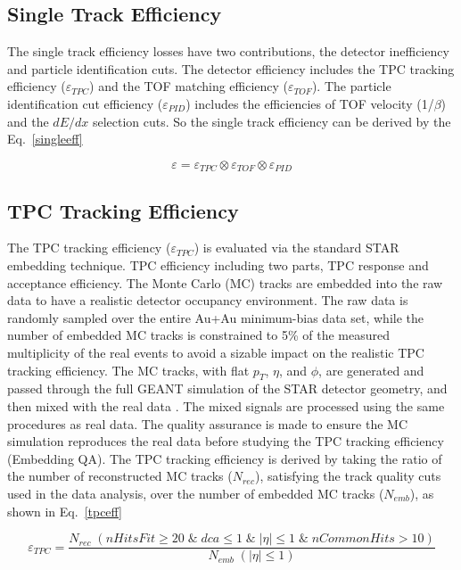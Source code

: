 \subsection{Single Track Efficiency}

The single track efficiency losses have two contributions, the detector inefficiency and particle identification cuts. The detector efficiency includes the TPC tracking efficiency ($\varepsilon_{TPC}$) and the TOF matching efficiency ($\varepsilon_{TOF}$). The particle identification cut efficiency ($\varepsilon_{PID}$) includes the efficiencies of TOF velocity (1/$\beta$) and the $dE/dx$ selection cuts. So the single track efficiency can be derived by the Eq.~\ref{singleeff}

\begin{equation}
\varepsilon = \varepsilon_{TPC} \otimes \varepsilon_{TOF} \otimes \varepsilon_{PID}
\label{singleeff}
\end{equation}

\subsection{TPC Tracking Efficiency}

The TPC tracking efficiency ($\varepsilon_{TPC}$) is evaluated via the standard STAR embedding technique. TPC efficiency including two parts, TPC response and acceptance efficiency. The Monte Carlo (MC) tracks are embedded into the raw data to have a realistic detector occupancy environment. The raw data is randomly sampled over the entire Au+Au minimum-bias data set, while the number of embedded MC tracks is constrained to 5\% of the measured multiplicity of the real events to avoid a sizable impact on the realistic TPC tracking efficiency. The MC tracks, with flat $p_{T}$, $\eta$, and $\phi$, are generated and passed through the full GEANT simulation of the STAR detector geometry, and then mixed with the real data . The mixed signals are processed using the same procedures as real data.  The quality assurance is made to ensure the MC simulation reproduces the real data before studying the TPC tracking efficiency (Embedding QA). The TPC tracking efficiency is derived by taking the ratio of the number of reconstructed MC tracks ($N_{rec}$), satisfying the track quality cuts used in the data analysis, over the number of embedded MC tracks ($N_{emb}$), as shown in Eq.~\ref{tpceff}

\begin{equation}
\varepsilon_{TPC} = \frac{N_{rec}\;(nHitsFit\geq20\;\&\;dca\leq1\;\&\;|\eta|\leq1\;\&\;nCommonHits > 10)}{N_{emb}\;(|\eta|\leq1)}
\label{tpceff}
\end{equation}

